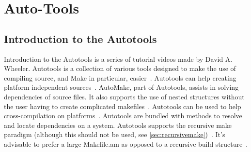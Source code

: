 
\section{Auto-Tools}
\label{sect:esan}
\subsection{Introduction to the Autotools}
Introduction to the Autotools is a series of tutorial videos made by David A. Wheeler\cite{wheeler2012autopart1,wheeler2012autopart2,wheeler2012autopart3}.
Autotools is a collection of various tools designed to make the use of compiling source, and Make in particular, easier~\citep{wheeler2012autopart1}. Autotools can help creating platform independent sources~\citep{wheeler2012autopart1}. AutoMake, part of Autotools,  assists in solving dependencies of source files. It also supports the use of nested structures without the user having to create complicated makefiles~\cite{wheeler2012autopart2}. Autotools can be used to help cross-compilation on platforms~\citep{wheeler2012autopart2}. Autotools are bundled with methods to resolve and locate dependencies on a system.
Autotools supports the recursive make paradigm (although this should not be used, see \ref{sec:recursivemake})~\citep{wheeler2012autopart3}. It's advisable to prefer a large Makefile.am as opposed to a recursive build structure~\citep{miller1998recursive,wheeler2012autopart3}.

